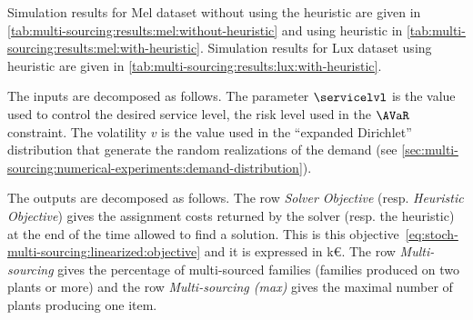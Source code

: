 

Simulation results for Mel dataset without using the heuristic are given in \cref{tab:multi-sourcing:results:mel:without-heuristic} and using heuristic in \cref{tab:multi-sourcing:results:mel:with-heuristic}.
Simulation results for Lux dataset using heuristic are given in \cref{tab:multi-sourcing:results:lux:with-heuristic}.


The inputs are decomposed as follows.
The parameter $\servicelvl$ is the value used to control the desired service level, \ie the risk level used in the $\AVaR$ constraint.
The volatility $v$ is the value used in the ``expanded Dirichlet'' distribution that generate the random realizations of the demand (see \cref{sec:multi-sourcing:numerical-experiments:demand-distribution}).


The outputs are decomposed as follows.
The row \emph{Solver Objective} (resp. \emph{Heuristic Objective}) gives the assignment costs returned by the solver (resp. the heuristic) at the end of the time allowed to find a solution.
This is this objective~\eqref{eq:stoch-multi-sourcing:linearized:objective} and it is expressed in k\euro{}.
The row \emph{Multi-sourcing} gives the percentage of multi-sourced families (\ie families produced on two plants or more) and the row \emph{Multi-sourcing (max)} gives the maximal number of plants producing one item.


